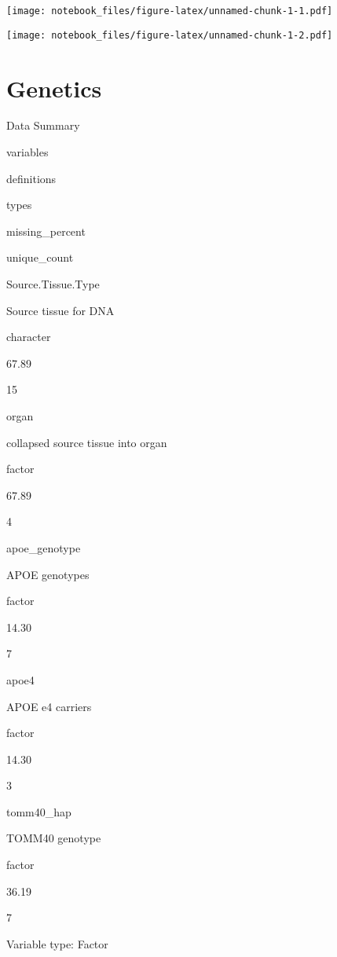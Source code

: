 \documentclass[]{book}
\newenvironment{Shaded}{\begin{snugshade}}{\end{snugshade}}
\newcommand{\DataTypeTok}[1]{\textcolor[rgb]{0.13,0.29,0.53}{#1}}
\newcommand{\DecValTok}[1]{\textcolor[rgb]{0.00,0.00,0.81}{#1}}
\newcommand{\KeywordTok}[1]{\textcolor[rgb]{0.13,0.29,0.53}{\textbf{#1}}}
\newcommand{\NormalTok}[1]{#1}
\newcommand{\OperatorTok}[1]{\textcolor[rgb]{0.81,0.36,0.00}{\textbf{#1}}}
\newcommand{\StringTok}[1]{\textcolor[rgb]{0.31,0.60,0.02}{#1}}
\begin{document}
\texttt{[image: notebook\_files/figure-latex/unnamed-chunk-1-1.pdf]}

\begin{Shaded}
\end{Shaded}

\texttt{[image: notebook\_files/figure-latex/unnamed-chunk-1-2.pdf]}

\hypertarget{genetics}{%
\section{Genetics}\label{genetics}}

\label{tab:rosmap-genetic-global}Data Summary

variables

definitions

types

missing\_percent

unique\_count

Source.Tissue.Type

Source tissue for DNA

character

67.89

15

organ

collapsed source tissue into organ

factor

67.89

4

apoe\_genotype

APOE genotypes

factor

14.30

7

apoe4

APOE e4 carriers

factor

14.30

3

tomm40\_hap

TOMM40 genotype

factor

36.19

7

\label{tab:rosmap-genetic-factor}Variable type: Factor
\end{document}
